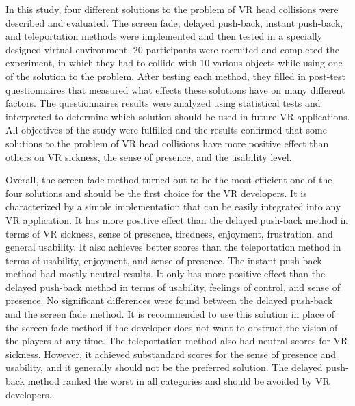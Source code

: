 In this study, four different solutions to the problem of VR head collisions were described and evaluated. The screen fade, delayed push-back, instant push-back, and teleportation methods were implemented and then tested in a specially designed virtual environment. 20 participants were recruited and completed the experiment, in which they had to collide with 10 various objects while using one of the solution to the problem. After testing each method, they filled in post-test questionnaires that measured what effects these solutions have on many different factors. The questionnaires results were analyzed using statistical tests and interpreted to determine which solution should be used in future VR applications. All objectives of the study were fulfilled and the results confirmed that some solutions to the problem of VR head collisions have more positive effect than others on VR sickness, the sense of presence, and the usability level.

Overall, the screen fade method turned out to be the most efficient one of the four solutions and should be the first choice for the VR developers. It is characterized by a simple implementation that can be easily integrated into any VR application. It has more positive effect than the delayed push-back method in terms of VR sickness, sense of presence, tiredness, enjoyment, frustration, and general usability. It also achieves better scores than the teleportation method in terms of usability, enjoyment, and sense of presence. The instant push-back method had mostly neutral results. It only has more positive effect than the delayed push-back method in terms of usability, feelings of control, and sense of presence. No significant differences were found between the delayed push-back and the screen fade method. It is recommended to use this solution in place of the screen fade method if the developer does not want to obstruct the vision of the players at any time. The teleportation method also had neutral scores for VR sickness. However, it achieved substandard scores for the sense of presence and usability, and it generally should not be the preferred solution. The delayed push-back method ranked the worst in all categories and should be avoided by VR developers.

